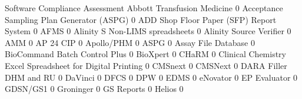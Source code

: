 \documentclass{article}
\begin{document}
\begin{Schunk}
\begin{Soutput}
                                                            Software Compliance Assessment
  Abbott Transfusion Medicine                                                            0
  Acceptance Sampling Plan Generator (ASPG)                                              0
  ADD Shop Floor Paper (SFP) Report System                                               0
  AFMS                                                                                   0
  Alinity S Non-LIMS spreadsheets                                                        0
  Alinity Source Verifier                                                                0
  AMM                                                                                    0
  AP 24 CIP                                                                              0
  Apollo/PHM                                                                             0
  ASPG                                                                                   0
  Assay File Database                                                                    0
  BioCommand Batch Control Plus                                                          0
  BioXpert                                                                               0
  CHaRM                                                                                  0
  Clinical Chemistry Excel Spreadsheet for Digital Printing                              0
  CMSnext                                                                                0
  CMSNext                                                                                0
  DARA Filler DHM and RU                                                                 0
  DaVinci                                                                                0
  DFCS                                                                                   0
  DPW                                                                                    0
  EDMS                                                                                   0
  eNovator                                                                               0
  EP Evaluator                                                                           0
  GDSN/GS1                                                                               0
  Groninger                                                                              0
  GS Reports                                                                             0
  Helios                                                                                 0

\end{Soutput}
\end{Schunk}
\end{document}
